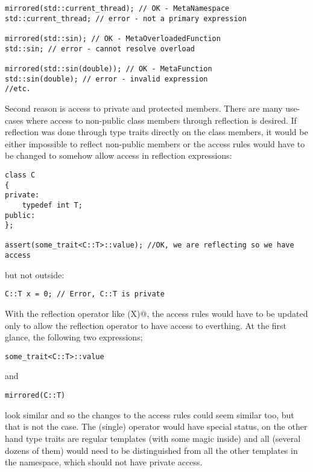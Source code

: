 \begin{verbatim}
mirrored(std::current_thread); // OK - MetaNamespace
std::current_thread; // error - not a primary expression

mirrored(std::sin); // OK - MetaOverloadedFunction
std::sin; // error - cannot resolve overload

mirrored(std::sin(double)); // OK - MetaFunction
std::sin(double); // error - invalid expression
//etc.
\end{verbatim}


Second reason is access to private and protected members. There are many use-cases where
access to non-public class members through reflection is desired. If reflection was
done through type traits directly on the class members, it would be either impossible
to reflect non-public members or the access rules would have to be changed to somehow
allow access in reflection expressions:

\begin{verbatim}
class C
{
private:
	typedef int T;
public:
};

assert(some_trait<C::T>::value); //OK, we are reflecting so we have access
\end{verbatim}

but not outside:

\begin{verbatim}
C::T x = 0; // Error, C::T is private
\end{verbatim}

With the reflection operator like \verb@mirrored(X)@, the access rules would have
to be updated only to allow the reflection operator to have access to everthing.
At the first glance, the following two expressions;

\begin{verbatim}
some_trait<C::T>::value
\end{verbatim}

and

\begin{verbatim}
mirrored(C::T)
\end{verbatim}

look similar and so the changes to the access rules could seem similar too, but
that is not the case. The (single) \verb@mirrored@ operator would have special status,
on the other hand type traits are regular templates (with some magic inside) and
all (several dozens of them) would need to be distinguished from all the other templates
in the \verb@std@ namespace, which should not have private access.

